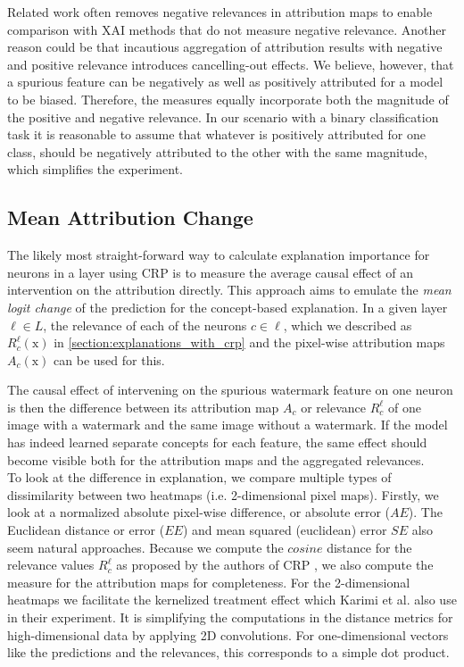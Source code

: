 Related work often removes negative relevances in attribution maps to enable comparison with XAI methods that do not measure negative relevance. Another reason could be that incautious aggregation of attribution results with negative and positive relevance introduces cancelling-out effects. We believe, however, that a spurious feature can be negatively as well as positively attributed for a model to be biased. Therefore, the measures equally incorporate both the magnitude of the positive and negative relevance. In our scenario with a binary classification task it is reasonable to assume that whatever is positively attributed for one class, should be negatively attributed to the other with the same magnitude, which simplifies the experiment.

\subsection{Mean Attribution Change}\label{section:measure_mac}
The likely most straight-forward way to calculate explanation importance for neurons in a layer using CRP is to measure the average causal effect of an intervention on the attribution directly. This approach aims to emulate the \textit{mean logit change} of the prediction for the concept-based explanation. In a given layer $\ell \in L$, the relevance of each of the neurons $c \in \ell$, which we described as $R_c^{\ell}(\mathrm{x})$ in \cref{section:explanations_with_crp} and the pixel-wise attribution maps $A_c(\mathrm{x})$ can be used for this.

The causal effect of intervening on the spurious watermark feature on one neuron is then the difference between its attribution map $A_c$ or relevance $R_c^{\ell}$ of one image with a watermark and the same image without a watermark. If the model has indeed learned separate concepts for each feature, the same effect should become visible both for the attribution maps and the aggregated relevances.\\

To look at the difference in explanation, we compare multiple types of dissimilarity between two heatmaps (i.e. 2-dimensional pixel maps). Firstly, we look at a normalized absolute pixel-wise difference, or absolute error ($AE$). The Euclidean distance or error ($EE$) and mean squared (euclidean) error $SE$ also seem natural approaches. Because we compute the $cosine$ distance for the relevance values $R_c^{\ell}$ as proposed by the authors of CRP \cite{Achtibat2023}, we also compute the measure for the attribution maps for completeness.
For the 2-dimensional heatmaps we facilitate the kernelized treatment effect which Karimi et al. \cite{Karimi2023} also use in their experiment. It is simplifying the computations in the distance metrics for high-dimensional data by applying 2D convolutions. For one-dimensional vectors like the predictions and the relevances, this corresponds to a simple dot product. \\ 

